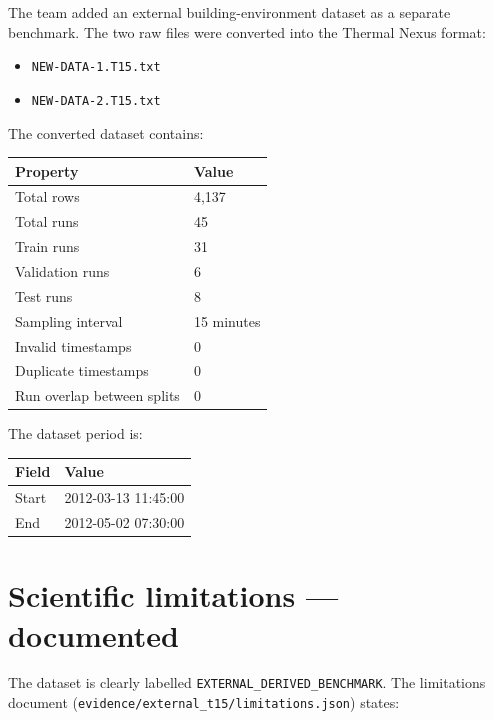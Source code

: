 \documentclass[11pt,a4paper]{article}
\begin{document}
The team added an external building-environment dataset as a separate
benchmark. The two raw files were converted into the Thermal Nexus
format:

\begin{itemize}[leftmargin=2em,itemsep=2pt]
  \item \texttt{NEW-DATA-1.T15.txt}
  \item \texttt{NEW-DATA-2.T15.txt}
\end{itemize}

The converted dataset contains:

\begin{center}
\begin{tabularx}{0.85\textwidth}{L{5cm}L{8cm}}
\toprule
\textbf{Property} & \textbf{Value} \\
\midrule
Total rows              & 4{,}137 \\
Total runs              & 45 \\
Train runs              & 31 \\
Validation runs         & 6 \\
Test runs               & 8 \\
Sampling interval       & 15 minutes \\
Invalid timestamps      & 0 \\
Duplicate timestamps    & 0 \\
Run overlap between splits & 0 \\
\bottomrule
\end{tabularx}
\end{center}

\noindent The dataset period is:
\begin{center}
\begin{tabular}{ll}
\toprule
\textbf{Field} & \textbf{Value} \\
\midrule
Start & 2012-03-13 11:45:00 \\
End   & 2012-05-02 07:30:00 \\
\bottomrule
\end{tabular}
\end{center}

\section{Scientific limitations --- documented}

The dataset is clearly labelled \texttt{EXTERNAL\_DERIVED\_BENCHMARK}. The
limitations document (\texttt{evidence/external\_t15/limitations.json})
states:
\end{document}
